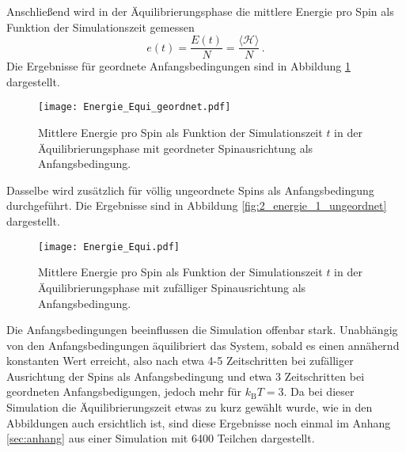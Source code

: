 Anschließend wird in der Äquilibrierungsphase die mittlere Energie pro Spin als Funktion der Simulationszeit gemessen
\begin{equation*}
    e(t) = \frac{E(t)}{N} = \frac{\langle \mathcal{H} \rangle}{N} \, .
\end{equation*} 
Die Ergebnisse für geordnete Anfangsbedingungen sind in Abbildung \ref{fig:2_energie_geordnet} dargestellt.
\FloatBarrier
\begin{figure}[H]
    \centering
    \texttt{[image: Energie\_Equi\_geordnet.pdf]}
    \caption{Mittlere Energie pro Spin als Funktion der Simulationszeit $t$ in der Äquilibrierungsphase mit geordneter Spinausrichtung als Anfangsbedingung.}
    \label{fig:2_energie_geordnet}
\end{figure}
\FloatBarrier
\noindent
Dasselbe wird zusätzlich für völlig ungeordnete Spins als Anfangsbedingung durchgeführt. Die Ergebnisse sind 
in Abbildung \ref{fig:2_energie_1_ungeordnet} dargestellt.
\FloatBarrier
\begin{figure}[H]
    \centering
    \texttt{[image: Energie\_Equi.pdf]}
    \caption{Mittlere Energie pro Spin als Funktion der Simulationszeit $t$ in der Äquilibrierungsphase mit zufälliger Spinausrichtung als Anfangsbedingung.}
    \label{fig:2_energie_ungeordnet}
\end{figure}
\FloatBarrier
\noindent
Die Anfangsbedingungen beeinflussen die Simulation offenbar stark. Unabhängig von den Anfangsbedingungen 
äquilibriert das System, sobald es einen annähernd konstanten Wert erreicht, also nach etwa 4-5 Zeitschritten bei zufälliger 
Ausrichtung der Spins als Anfangsbedingung und etwa 3 Zeitschritten bei geordneten Anfangsbedigungen, jedoch mehr für $k_\text{B}T = 3$.
Da bei dieser Simulation die Äquilibrierungszeit etwas zu kurz gewählt wurde, wie in den Abbildungen auch ersichtlich ist,
sind diese Ergebnisse noch einmal im Anhang \ref{sec:anhang} aus einer Simulation mit 6400 Teilchen dargestellt.

